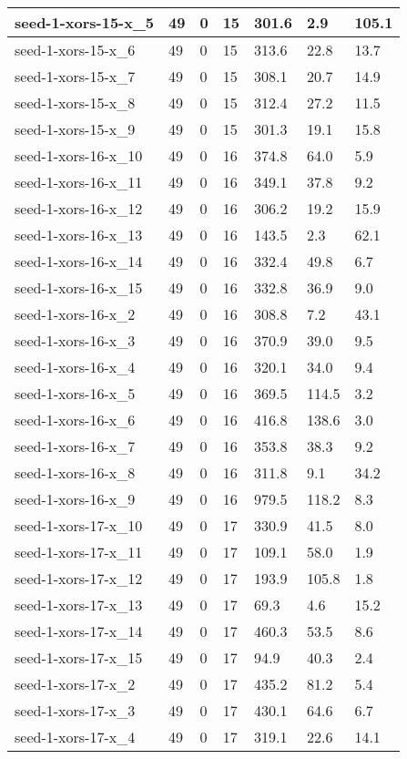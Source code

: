 \begin{scriptsize}
\begin{longtable}{|p{5cm}|l|l|l|l|l|l|}
seed-1-xors-15-x\_5&49&0&15&301.6&2.9&105.1 \\ \hline 
seed-1-xors-15-x\_6&49&0&15&313.6&22.8&13.7 \\ \hline 
seed-1-xors-15-x\_7&49&0&15&308.1&20.7&14.9 \\ \hline 
seed-1-xors-15-x\_8&49&0&15&312.4&27.2&11.5 \\ \hline 
seed-1-xors-15-x\_9&49&0&15&301.3&19.1&15.8 \\ \hline 
seed-1-xors-16-x\_10&49&0&16&374.8&64.0&5.9 \\ \hline 
seed-1-xors-16-x\_11&49&0&16&349.1&37.8&9.2 \\ \hline 
seed-1-xors-16-x\_12&49&0&16&306.2&19.2&15.9 \\ \hline 
seed-1-xors-16-x\_13&49&0&16&143.5&2.3&62.1 \\ \hline 
seed-1-xors-16-x\_14&49&0&16&332.4&49.8&6.7 \\ \hline 
seed-1-xors-16-x\_15&49&0&16&332.8&36.9&9.0 \\ \hline 
seed-1-xors-16-x\_2&49&0&16&308.8&7.2&43.1 \\ \hline 
seed-1-xors-16-x\_3&49&0&16&370.9&39.0&9.5 \\ \hline 
seed-1-xors-16-x\_4&49&0&16&320.1&34.0&9.4 \\ \hline 
seed-1-xors-16-x\_5&49&0&16&369.5&114.5&3.2 \\ \hline 
seed-1-xors-16-x\_6&49&0&16&416.8&138.6&3.0 \\ \hline 
seed-1-xors-16-x\_7&49&0&16&353.8&38.3&9.2 \\ \hline 
seed-1-xors-16-x\_8&49&0&16&311.8&9.1&34.2 \\ \hline 
seed-1-xors-16-x\_9&49&0&16&979.5&118.2&8.3 \\ \hline 
seed-1-xors-17-x\_10&49&0&17&330.9&41.5&8.0 \\ \hline 
seed-1-xors-17-x\_11&49&0&17&109.1&58.0&1.9 \\ \hline 
seed-1-xors-17-x\_12&49&0&17&193.9&105.8&1.8 \\ \hline 
seed-1-xors-17-x\_13&49&0&17&69.3&4.6&15.2 \\ \hline 
seed-1-xors-17-x\_14&49&0&17&460.3&53.5&8.6 \\ \hline 
seed-1-xors-17-x\_15&49&0&17&94.9&40.3&2.4 \\ \hline 
seed-1-xors-17-x\_2&49&0&17&435.2&81.2&5.4 \\ \hline 
seed-1-xors-17-x\_3&49&0&17&430.1&64.6&6.7 \\ \hline 
seed-1-xors-17-x\_4&49&0&17&319.1&22.6&14.1 \\ \hline 

\end{longtable}
\end{scriptsize}
